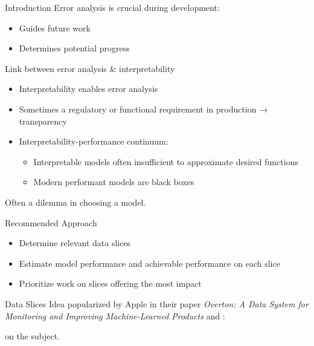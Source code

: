 \begin{frame}{Introduction}
  Error analysis is crucial during development:
  
  \begin{itemize}
    \item Guides future work
    \item Determines potential progress
  \end{itemize}
\end{frame}

\begin{frame}{Link between error analysis \& interpretability}
  \begin{itemize}
    \item Interpretability enables error analysis
    \item Sometimes a regulatory or functional requirement in production → transparency
    \item Interpretability-performance continuum:
      \begin{itemize}
        \item Interpretable models often insufficient to approximate desired functions
        \item Modern performant models are black boxes
      \end{itemize}
  \end{itemize}
  
  Often a dilemma in choosing a model.
\end{frame}

\begin{frame}{Recommended Approach}
  \begin{itemize}
    \item Determine relevant data slices
    \item Estimate model performance and achievable performance on each slice
    \item Prioritize work on slices offering the most impact
  \end{itemize}
\end{frame}

\begin{frame}{Data Slices}
  Idea popularized by Apple in their paper \textit{Overton: A Data System for Monitoring and Improving Machine-Learned Products} and :
  
   on the subject.
\end{frame}

